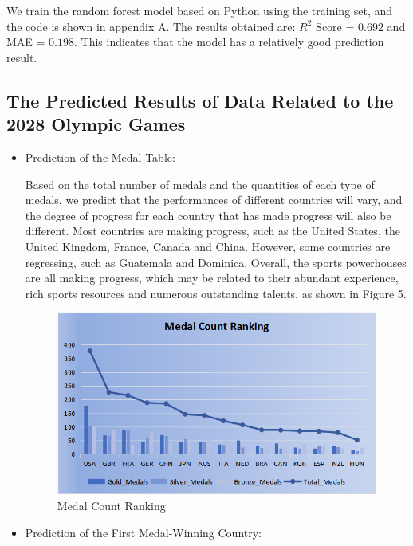 \documentclass{mcmthesis}  %
\begin{document}
We train the random forest model based on Python using the training set, and the code is shown in appendix A. The results obtained are: $R^2$ Score = $0.692$ and MAE = $0.198$. This indicates that the model has a relatively good prediction result.

\subsection{The Predicted Results of Data Related to the 2028 Olympic Games}  %
\begin{itemize}  %
\item Prediction of the Medal Table:

Based on the total number of medals and the quantities of each type of medals, we predict that the performances of different countries will vary, and the degree of progress for each country that has made progress will also be different. Most countries are making progress, such as the United States, the United Kingdom, France, Canada and China. However, some countries are regressing, such as Guatemala and Dominica. Overall, the sports powerhouses are all making progress, which may be related to their abundant experience, rich sports resources and numerous outstanding talents, as shown in Figure 5. 
\begin{figure}[H]  %
\small
\centering  %
\includegraphics[width=14cm]{2028.png}  %
\caption{Medal Count Ranking}  %
\end{figure}  %

\item Prediction of the First Medal-Winning Country:


\end{itemize}
\end{document}
